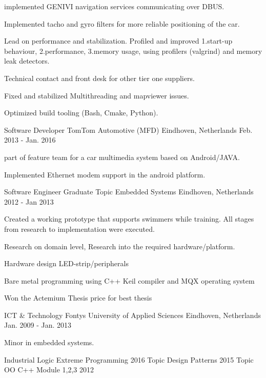 \begin{cventries}
{\begin{cvitems}
        \item{implemented GENIVI navigation services communicating over DBUS.}
        \item {Implemented tacho and gyro filters for more reliable positioning of the car. }
        \item {Lead on performance and stabilization. Profiled and improved 1.start-up behaviour, 2.performance, 3.memory usage, using profilers (valgrind) and memory leak detectors.}
        \item {Technical contact and front desk for other tier one suppliers.}
        \item {Fixed and stabilized Multithreading and mapviewer issues.}
        \item {Optimized build tooling (Bash, Cmake, Python).}
      \end{cvitems}
    }
  \cventry
    {Software Developer}
    {TomTom Automotive (MFD)}
    {Eindhoven, Netherlands}
    {Feb. 2013 - Jan. 2016}
    {
      \begin{cvitems}
        \item {part of feature team for a car multimedia system based on Android/JAVA.}
        \item {Implemented Ethernet modem support in the android platform.}
      \end{cvitems} 
    }
  \cventry
    {Software Engineer Graduate}
    {Topic Embedded Systems}
    {Eindhoven, Netherlands}
    {2012 - Jan 2013}
    {
      \begin{cvitems}
        \item {Created a working prototype that supports swimmers while training. All stages from research to implementation were executed.}
        \item {Research on domain level, Research into the required hardware/platform.}
        \item {Hardware design LED-strip/peripherals}
        \item {Bare metal programming using C++ Keil compiler and MQX operating system}
        \item {Won the Actemium Thesis price for best thesis}
      \end{cvitems}
    }
\end{cventries}
\newpage


\begin{cventries}
  \cventry
    {ICT \& Technology}
    {Fontys University of Applied Sciences}
    {Eindhoven, Netherlands}
    {Jan. 2009 - Jan. 2013}
    {
      \begin{cvitems}
        \item {Minor in embedded systems.}
      \end{cvitems}
    }
\end{cventries}
\begin{cventries}
  \cventry
    {Industrial Logic}
    {Extreme Programming}
    {}
    {2016}
    {}
      \cventry
    {Topic}
    {Design Patterns}
    {}
    {2015}
    {}
      \cventry
    {Topic}
    {OO C++ Module 1,2,3}
    {}
    {2012}
    {}
\end{cventries}

